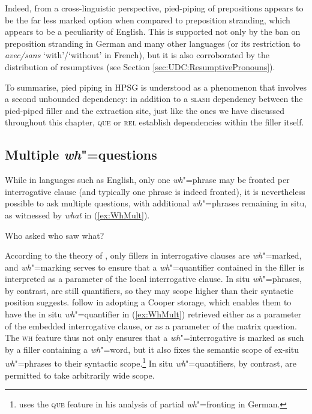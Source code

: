 \documentclass[output=paper
                ,modfonts
                ,nonflat
	        ,collection
	        ,collectionchapter
	        ,collectiontoclongg
 	        ,biblatex
                ,babelshorthands
                ,newtxmath
                ,draftmode
                ,colorlinks, citecolor=brown
]{./langsci/langscibook}
\begin{document}
{\begin{exe}
  \ex \label{ex:WhPiedPipingOblique}
  \begin{xlist}
  \end{xlist}
\end{exe}

\noindent
Indeed, from a cross-linguistic perspective, pied-piping of
prepositions appears to be the far less marked option when compared to
preposition stranding, which appears to be a peculiarity of
English. This is supported not only by the ban on preposition
stranding in German and many other languages (or its restriction to
\textit{avec/sans} `with'/`without' in French), but it is also
corroborated by the distribution of resumptives (see Section
\ref{sec:UDC:ResumptivePronouns}).

To summarise, pied piping in HPSG is understood as a phenomenon that
involves a second unbounded dependency: in addition to a
\textsc{slash} dependency between the pied-piped filler and the
extraction site, just like the ones we have discussed throughout this
chapter, \textsc{que} or \textsc{rel} establish dependencies within
the filler itself.

\subsection{Multiple \emph{wh}"=questions}


While in languages such as English, only one \emph{wh}"=phrase may be
fronted per interrogative clause (and typically one phrase is indeed
fronted), it is nevertheless possible to ask multiple questions, with
additional \emph{wh}"=phrases remaining in situ, as witnessed by
\textit{what} in (\ref{ex:WhMult}).

\begin{exe}
  \ex Who asked who saw what? \label{ex:WhMult}
\end{exe}

\noindent
According to the theory of \citet{Ginzburg:Sag:01}, only fillers in
interrogative clauses are \emph{wh}"=marked, and \emph{wh}"=marking
serves to ensure that a \emph{wh}"=quantifier contained in the filler
is interpreted as a parameter of the local interrogative clause. In
situ \emph{wh}"=phrases, by contrast, are still quantifiers, so they
may scope higher than their syntactic position suggests.
\citet{Ginzburg:Sag:01} follow \citet{Pollard:Sag:94} in adopting a
Cooper storage, which enables them to have the in situ
\emph{wh}"=quantifier in (\ref{ex:WhMult}) retrieved either as a
parameter of the embedded interrogative clause, or as a parameter of
the matrix question. The \textsc{wh} feature thus not only ensures
that a \emph{wh}"=interrogative is marked as such by a filler
containing a \emph{wh}"=word, but it also fixes the semantic scope of
ex-situ \emph{wh}"=phrases to their syntactic
scope.\footnote{\citet{kathol:scope-marking} uses the \textsc{que}
  feature in his analysis of partial \emph{wh}"=fronting in German. }
In situ \emph{wh}"=quantifiers, by contrast, are permitted to take
arbitrarily wide scope.

}
\end{document}
